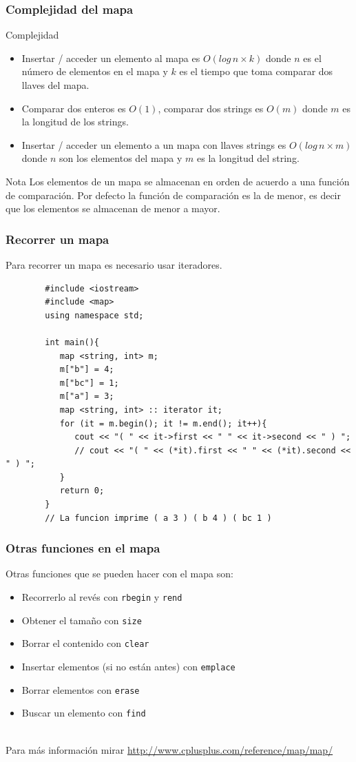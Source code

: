 \documentclass{beamer}
\begin{document}
	\begin{frame}
		\frametitle{Complejidad del mapa}
		\begin{block}{Complejidad}
			\begin{itemize}
				\item Insertar / acceder un elemento al mapa es $O(log\,n \times k)$ donde $n$ es el número de elementos en el mapa y $k$ es el tiempo que toma comparar dos llaves del mapa.
				\item Comparar dos enteros es $O(1)$, comparar dos strings es $O(m)$ donde $m$ es la longitud de los strings.
				\item Insertar / acceder un elemento a un mapa con llaves strings es $O(log\,n \times m)$ donde $n$ son los elementos del mapa y $m$ es la longitud del string.
			\end{itemize}
		\end{block}
		\begin{block}{Nota}
			Los elementos de un mapa se almacenan en orden de acuerdo a una función de comparación. Por defecto la función de comparación es la de menor, es decir que los elementos se almacenan de menor a mayor.
		\end{block}
	\end{frame}
	
	\begin{frame}[fragile]
		\frametitle{Recorrer un mapa}
		Para recorrer un mapa es necesario usar iteradores.\\
		\begin{lstlisting}
		#include <iostream>
		#include <map>
		using namespace std;

		int main(){
		   map <string, int> m;
		   m["b"] = 4;
		   m["bc"] = 1;
		   m["a"] = 3;
		   map <string, int> :: iterator it;
		   for (it = m.begin(); it != m.end(); it++){
		      cout << "( " << it->first << " " << it->second << " ) ";
		      // cout << "( " << (*it).first << " " << (*it).second << " ) ";
		   }
		   return 0;
		}
		// La funcion imprime ( a 3 ) ( b 4 ) ( bc 1 )
		\end{lstlisting}
	\end{frame}
	
	\begin{frame}[fragile]
		\frametitle{Otras funciones en el mapa}
		Otras funciones que se pueden hacer con el mapa son:\\
		\begin{itemize}
			\item Recorrerlo al revés con \verb|rbegin| y \verb|rend|
			\item Obtener el tamaño con \verb|size|
			\item Borrar el contenido con \verb|clear|
			\item Insertar elementos (si no están antes) con \verb|emplace|
			\item Borrar elementos con \verb|erase|
			\item Buscar un elemento con \verb|find|
		\end{itemize}
		\quad \\
		Para más información mirar \url{http://www.cplusplus.com/reference/map/map/}
	\end{frame}
	
\end{document}
